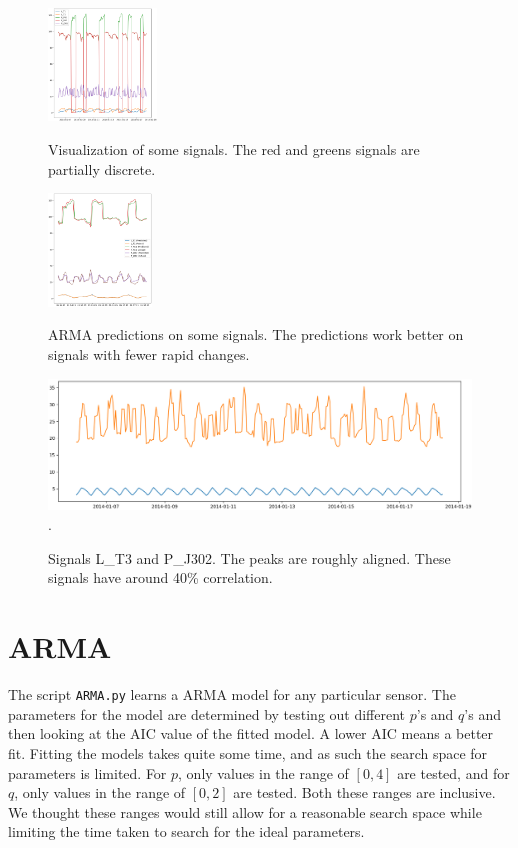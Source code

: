 \documentclass[]{article}
\begin{document}
\begin{center}
\begin{figure}[H]
\begin{minipage}{.5\textwidth}
  \includegraphics[width=1\linewidth, height=3cm]{./visuallizations/signals.png}
  \caption{Visualization of some signals. The red and greens signals are partially discrete.}
  \label{signals}
\end{minipage} %
\begin{minipage}{.5\textwidth}
  \includegraphics[width=1\linewidth, height=3cm]{./visuallizations/predictions.png}
   \caption{ARMA predictions on some signals. The predictions work better on signals with fewer rapid changes.}
  \label{predictions}
\end{minipage}
\begin{minipage}{.5\textwidth}
  \includegraphics[width=2\linewidth, height=3.5cm]{./visuallizations/correlated_signals.png}.
  \label{correlation}
  \caption{Signals L\_T3 and P\_J302. The peaks are roughly aligned. These signals have around 40\% correlation.}
\end{minipage}%
\end{figure}
\end{center}

\clearpage
\section{ARMA}
The script \texttt{ARMA.py} learns a ARMA model for any particular sensor. The parameters for the model are determined by testing out different $p$'s and $q$'s and then looking at the AIC value of the fitted model. A lower AIC means a better fit. Fitting the models takes quite some time, and as such the search space for parameters is limited. For $p$, only values in the range of $[0, 4]$ are tested, and for $q$, only values in the range of $[0, 2]$ are tested. Both these ranges are inclusive. We thought these ranges would still allow for a reasonable search space while limiting the time taken to search for the ideal parameters.
\end{document}
